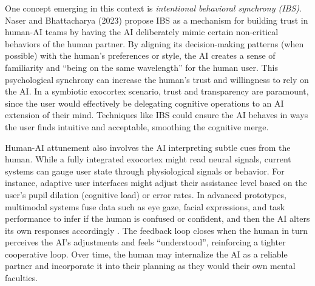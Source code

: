 \documentclass[11pt]{article}
\newcommand{\quotes}[1]{``#1''}
\begin{document}
One concept emerging in this context is \textit{intentional behavioral synchrony (IBS)}. Naser and Bhattacharya (2023) \cite{Naser2023} propose IBS as a mechanism for building trust in human-AI teams by having the AI deliberately mimic certain non-critical behaviors of the human partner. By aligning its decision-making patterns (when possible) with the human's preferences or style, the AI creates a sense of familiarity and \quotes{being on the same wavelength} for the human user. This psychological synchrony can increase the human's trust and willingness to rely on the AI. In a symbiotic exocortex scenario, trust and transparency are paramount, since the user would effectively be delegating cognitive operations to an AI extension of their mind. Techniques like IBS could ensure the AI behaves in ways the user finds intuitive and acceptable, smoothing the cognitive merge.

Human-AI attunement also involves the AI interpreting subtle cues from the human. While a fully integrated exocortex might read neural signals, current systems can gauge user state through physiological signals or behavior. For instance, adaptive user interfaces might adjust their assistance level based on the user's pupil dilation (cognitive load) or error rates. In advanced prototypes, multimodal systems fuse data such as eye gaze, facial expressions, and task performance to infer if the human is confused or confident, and then the AI alters its own responses accordingly \cite{Naser2023}. The feedback loop closes when the human in turn perceives the AI's adjustments and feels \quotes{understood}, reinforcing a tighter cooperative loop. Over time, the human may internalize the AI as a reliable partner and incorporate it into their planning as they would their own mental faculties.
\end{document}
